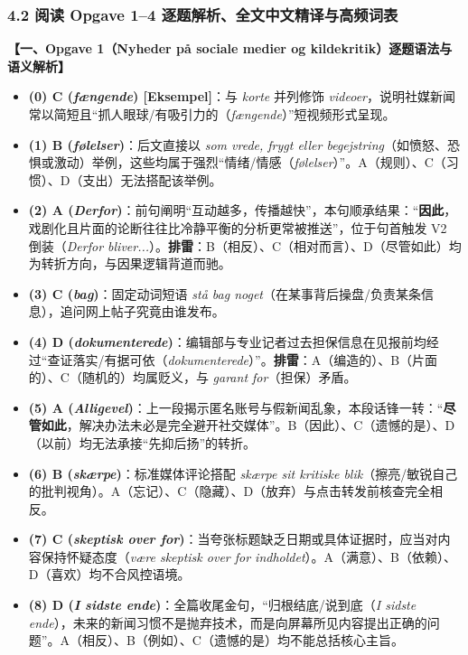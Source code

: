 \subsubsection*{4.2 阅读 Opgave 1--4 逐题解析、全文中文精译与高频词表}

\begin{answerbox}
\textbf{\color{NCDNavy}【一、Opgave 1（Nyheder på sociale medier og kildekritik）逐题语法与语义解析】}
\begin{itemize}
  \item \textbf{(0) C (\textit{fængende}) [Eksempel]}：与 \textit{korte} 并列修饰 \textit{videoer}，说明社媒新闻常以简短且“抓人眼球/有吸引力的（\textit{fængende}）”短视频形式呈现。
  \item \textbf{(1) B (\textit{følelser})}：后文直接以 \textit{som vrede, frygt eller begejstring}（如愤怒、恐惧或激动）举例，这些均属于强烈“情绪/情感（\textit{følelser}）”。A（规则）、C（习惯）、D（支出）无法搭配该举例。
  \item \textbf{(2) A (\textit{Derfor})}：前句阐明“互动越多，传播越快”，本句顺承结果：“\textbf{因此}，戏剧化且片面的论断往往比冷静平衡的分析更常被推送”，位于句首触发 V2 倒装（\textit{Derfor bliver...}）。\textbf{排雷}：B（相反）、C（相对而言）、D（尽管如此）均为转折方向，与因果逻辑背道而驰。
  \item \textbf{(3) C (\textit{bag})}：固定动词短语 \textit{stå bag noget}（在某事背后操盘/负责某条信息），追问网上帖子究竟由谁发布。
  \item \textbf{(4) D (\textit{dokumenterede})}：编辑部与专业记者过去担保信息在见报前均经过“查证落实/有据可依（\textit{dokumenterede}）”。\textbf{排雷}：A（编造的）、B（片面的）、C（随机的）均属贬义，与 \textit{garant for}（担保）矛盾。
  \item \textbf{(5) A (\textit{Alligevel})}：上一段揭示匿名账号与假新闻乱象，本段话锋一转：“\textbf{尽管如此}，解决办法未必是完全避开社交媒体”。B（因此）、C（遗憾的是）、D（以前）均无法承接“先抑后扬”的转折。
  \item \textbf{(6) B (\textit{skærpe})}：标准媒体评论搭配 \textit{skærpe sit kritiske blik}（擦亮/敏锐自己的批判视角）。A（忘记）、C（隐藏）、D（放弃）与点击转发前核查完全相反。
  \item \textbf{(7) C (\textit{skeptisk over for})}：当夸张标题缺乏日期或具体证据时，应当对内容保持怀疑态度（\textit{være skeptisk over for indholdet}）。A（满意）、B（依赖）、D（喜欢）均不合风控语境。
  \item \textbf{(8) D (\textit{I sidste ende})}：全篇收尾金句，“归根结底/说到底（\textit{I sidste ende}），未来的新闻习惯不是抛弃技术，而是向屏幕所见内容提出正确的问题”。A（相反）、B（例如）、C（遗憾的是）均不能总括核心主旨。
\end{itemize}
\end{answerbox}

